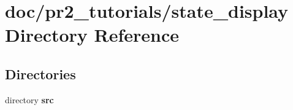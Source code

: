 \section{doc/pr2\-\_\-tutorials/state\-\_\-display Directory Reference}
\label{dir_371fcc84113ee2679d2a717b0f1275e3}
\subsection*{Directories}
\begin{DoxyCompactItemize}
\item 
directory {\bf src}
\end{DoxyCompactItemize}
